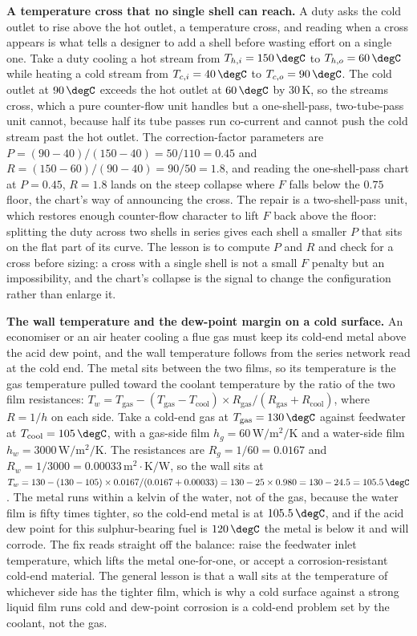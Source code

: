 \textbf{A temperature cross that no single shell can reach.} A duty asks the cold
outlet to rise above the hot outlet, a temperature cross, and reading when a cross
appears is what tells a designer to add a shell before wasting effort on a single
one. Take a duty cooling a hot stream from $T_{h,i} = 150\,\degC$ to
$T_{h,o} = 60\,\degC$ while heating a cold stream from $T_{c,i} = 40\,\degC$ to
$T_{c,o} = 90\,\degC$. The cold outlet at $90\,\degC$ exceeds the hot outlet at
$60\,\degC$ by $30\,\si{\kelvin}$, so the streams cross, which a pure counter-flow
unit handles but a one-shell-pass, two-tube-pass unit cannot, because half its tube
passes run co-current and cannot push the cold stream past the hot outlet. The
correction-factor parameters are $P = (90 - 40)/(150 - 40) = 50/110 = 0.45$ and
$R = (150 - 60)/(90 - 40) = 90/50 = 1.8$, and reading the one-shell-pass chart at
$P = 0.45$, $R = 1.8$ lands on the steep collapse where $F$ falls below the
$0.75$ floor, the chart's way of announcing the cross. The repair is a
two-shell-pass unit, which restores enough counter-flow character to lift $F$ back
above the floor: splitting the duty across two shells in series gives each shell a
smaller $P$ that sits on the flat part of its curve. The lesson is to compute $P$
and $R$ and check for a cross before sizing: a cross with a single shell is not a
small $F$ penalty but an impossibility, and the chart's collapse is the signal to
change the configuration rather than enlarge it.

\textbf{The wall temperature and the dew-point margin on a cold surface.} An
economiser or an air heater cooling a flue gas must keep its cold-end metal above
the acid dew point, and the wall temperature follows from the series network read
at the cold end. The metal sits between the two films, so its temperature is the
gas temperature pulled toward the coolant temperature by the ratio of the two
film resistances: $T_w = T_{\text{gas}} - (T_{\text{gas}} - T_{\text{cool}})
\times R_{\text{gas}}/(R_{\text{gas}} + R_{\text{cool}})$, where $R = 1/h$ on each
side. Take a cold-end gas at $T_{\text{gas}} = 130\,\degC$ against feedwater at
$T_{\text{cool}} = 105\,\degC$, with a gas-side film $h_g = 60\,\si{\watt\per\meter
\squared\per\kelvin}$ and a water-side film $h_w = 3000\,\si{\watt\per\meter
\squared\per\kelvin}$. The resistances are $R_g = 1/60 = 0.0167$ and
$R_w = 1/3000 = 0.00033\,\text{m}^2\cdot\si{\kelvin}/\text{W}$, so the wall sits at
$T_w = 130 - (130 - 105)\times 0.0167/(0.0167 + 0.00033) = 130 - 25\times 0.980 =
130 - 24.5 = 105.5\,\degC$. The metal runs within a kelvin of the water, not of the
gas, because the water film is fifty times tighter, so the cold-end metal is at
$105.5\,\degC$, and if the acid dew point for this sulphur-bearing fuel is
$120\,\degC$ the metal is below it and will corrode. The fix reads straight off the
balance: raise the feedwater inlet temperature, which lifts the metal one-for-one,
or accept a corrosion-resistant cold-end material. The general lesson is that a
wall sits at the temperature of whichever side has the tighter film, which is why a
cold surface against a strong liquid film runs cold and dew-point corrosion is a
cold-end problem set by the coolant, not the gas.

